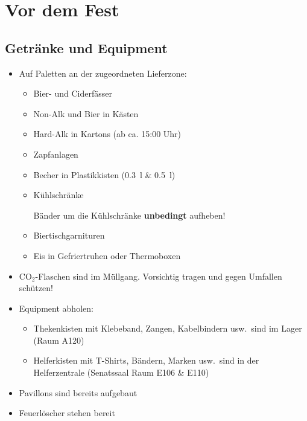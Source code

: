 \section{Vor dem Fest}
\subsection{Getränke und Equipment}
\begin{itemize}
  \item Auf Paletten an der zugeordneten Lieferzone:
    \begin{itemize}
      \item Bier- und Ciderfässer
      \item Non-Alk und Bier in Kästen
      \item Hard-Alk in Kartons (ab ca. 15:00 Uhr)
      \item Zapfanlagen
      \item Becher in Plastikkisten (\SI{0.3}{\litre} \& \SI{0.5}{\litre})
      \item Kühlschränke

        Bänder um die Kühlschränke \textbf{unbedingt} aufheben!
      \item Biertischgarnituren
      \item Eis in Gefriertruhen oder Thermoboxen
    \end{itemize}
  \item CO$_2$-Flaschen sind im Müllgang. Vorsichtig tragen und gegen Umfallen schützen!
  \item Equipment abholen:
    \begin{itemize}
      \item Thekenkisten mit Klebeband, Zangen, Kabelbindern usw.\ sind im Lager (Raum A120)
      \item Helferkisten mit T-Shirts, Bändern, Marken usw.\ sind in der Helferzentrale (Senatssaal Raum E106 \& E110)
    \end{itemize}
  \item Pavillons sind bereits aufgebaut
  \item Feuerlöscher stehen bereit
\end{itemize}
